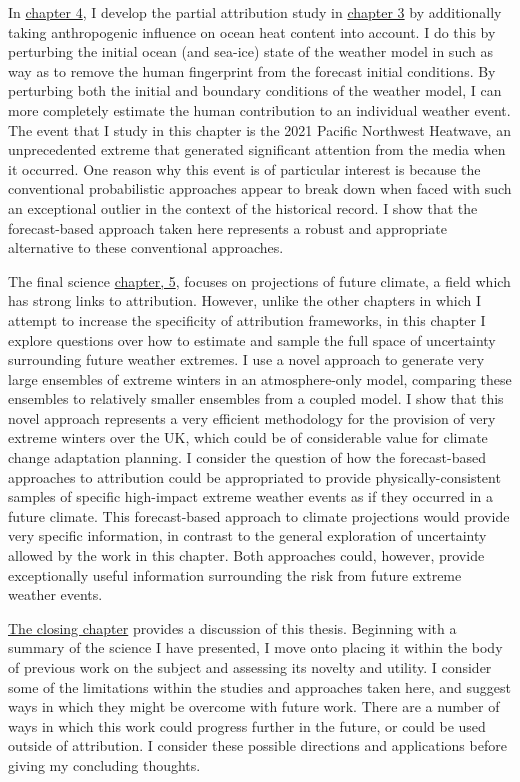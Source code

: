   In \hyperref[ch4]{chapter 4}, I develop the partial attribution study in \hyperref[ch3]{chapter 3} by additionally taking anthropogenic influence on ocean heat content into account. I do this by perturbing the initial ocean (and sea-ice) state of the weather model in such as way as to remove the human fingerprint from the forecast initial conditions. By perturbing both the initial and boundary conditions of the weather model, I can more completely estimate the human contribution to an individual weather event. The event that I study in this chapter is the 2021 Pacific Northwest Heatwave, an unprecedented extreme that generated significant attention from the media when it occurred. One reason why this event is of particular interest is because the conventional probabilistic approaches appear to break down when faced with such an exceptional outlier in the context of the historical record. I show that the forecast-based approach taken here represents a robust and appropriate alternative to these conventional approaches.

  The final science \hyperref[ch5]{chapter, 5}, focuses on projections of future climate, a field which has strong links to attribution. However, unlike the other chapters in which I attempt to increase the specificity of attribution frameworks, in this chapter I explore questions over how to estimate and sample the full space of uncertainty surrounding future weather extremes. I use a novel approach to generate very large ensembles of extreme winters in an atmosphere-only model, comparing these ensembles to relatively smaller ensembles from a coupled model. I show that this novel approach represents a very efficient methodology for the provision of very extreme winters over the UK, which could be of considerable value for climate change adaptation planning. I consider the question of how the forecast-based approaches to attribution could be appropriated to provide physically-consistent samples of specific high-impact extreme weather events as if they occurred in a future climate. This forecast-based approach to climate projections would provide very specific information, in contrast to the general exploration of uncertainty allowed by the work in this chapter. Both approaches could, however, provide exceptionally useful information surrounding the risk from future extreme weather events.

  \hyperref[discussion]{The closing chapter} provides a discussion of this thesis. Beginning with a summary of the science I have presented, I move onto placing it within the body of previous work on the subject and assessing its novelty and utility. I consider some of the limitations within the studies and approaches taken here, and suggest ways in which they might be overcome with future work. There are a number of ways in which this work could progress further in the future, or could be used outside of attribution. I consider these possible directions and applications before giving my concluding thoughts.
